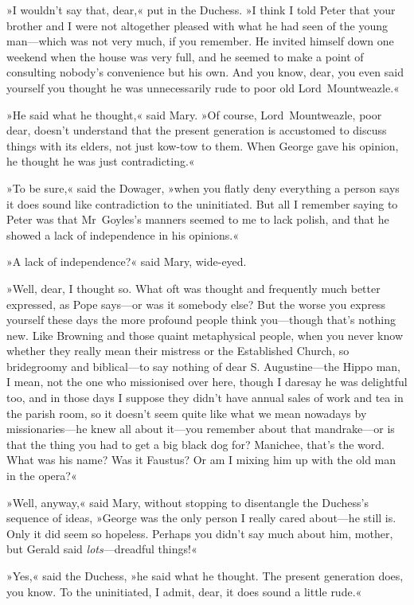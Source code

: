 »I wouldn't say that, dear,« put in the Duchess. »I think I told Peter that your brother and I were not altogether pleased with what he had seen of the young man—which was not very much, if you remember. He invited himself down one weekend when the house was very full, and he seemed to make a point of consulting nobody's convenience but his own. And you know, dear, you even said yourself you thought he was unnecessarily rude to poor old Lord~Mountweazle.«

»He said what he thought,« said Mary. »Of course, Lord~Mountweazle, poor dear, doesn't understand that the present generation is accustomed to discuss things with its elders, not just kow-tow to them. When George gave his opinion, he thought he was just contradicting.«

»To be sure,« said the Dowager, »when you flatly deny everything a person says it does sound like contradiction to the uninitiated. But all I remember saying to Peter was that Mr~Goyles's manners seemed to me to lack polish, and that he showed a lack of independence in his opinions.«

»A lack of independence?« said Mary, wide-eyed.

»Well, dear, I thought so. What oft was thought and frequently much better expressed, as Pope says—or was it somebody else? But the worse you express yourself these days the more profound people think you—though that's nothing new. Like Browning and those quaint metaphysical people, when you never know whether they really mean their mistress or the Established Church, so bridegroomy and biblical—to say nothing of dear S\@. Augustine—the Hippo man, I mean, not the one who missionised over here, though I daresay he was delightful too, and in those days I suppose they didn't have annual sales of work and tea in the parish room, so it doesn't seem quite like what we mean nowadays by missionaries—he knew all about it—you remember about that mandrake—or is that the thing you had to get a big black dog for?  Manichee, that's the word. What was his name? Was it Faustus? Or am I mixing him up with the old man in the opera?«

»Well, anyway,« said Mary, without stopping to disentangle the Duchess's sequence of ideas, »George was the only person I really cared about—he still is. Only it did seem so hopeless. Perhaps you didn't say much about him, mother, but Gerald said \textit{lots}—dreadful things!«

»Yes,« said the Duchess, »he said what he thought. The present generation does, you know. To the uninitiated, I admit, dear, it does sound a little rude.«

